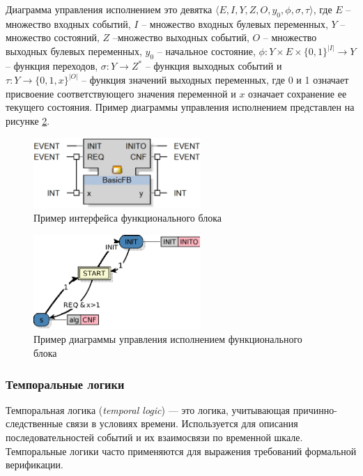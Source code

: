 \documentclass[14pt]{extarticle}
\theoremstyle{plain}
\theoremstyle{definition}
\begin{document}
Диаграмма управления исполнением это девятка $\langle E, I, Y, Z, O, y_0, \phi,
\sigma, \tau \rangle$, где $E$ -- множество входных событий, $I$ -- множество
входных булевых переменных, $Y$ -- множество состояний, $Z$ --множество
выходных событий, $O$ -- множество выходных булевых переменных, $y_0$ --
начальное состояние, $\phi : Y \times E \times \{0, 1\}^{|I|} \rightarrow
Y$ -- функция переходов, $\sigma : Y \rightarrow Z^*$ -- функция выходных
событий и $\tau : Y \rightarrow \{0, 1, x\}^{|O|}$ -- функция значений
выходных переменных, где 0 и 1 означает присвоение соответствующего значения
переменной и $x$ означает сохранение ее текущего состояния. Пример диаграммы
управления исполнением представлен на рисунке \ref{ecc-example}.

\begin{figure}[t]
    \centering
    \includegraphics[width=2.5in]{pic/ecc-interface.eps}
    \caption{Пример интерфейса функционального блока}
    \label{fb-interface-example}
\end{figure}

\begin{figure}[t]
    \centering
    \includegraphics[width=2.5in]{pic/ecc-example.eps}
    \caption{Пример диаграммы управления исполнением функционального блока}
    \label{ecc-example}
\end{figure}

\subsubsection{Темпоральные логики}

Темпоральная логика (\emph{temporal logic}) \cite{tl} --- это логика, учитывающая причинно-следственные связи в условиях времени.
Используется для описания последовательностей событий и их взаимосвязи по временной шкале.
Темпоральные логики часто применяются для выражения требований формальной верификации.
\end{document}
